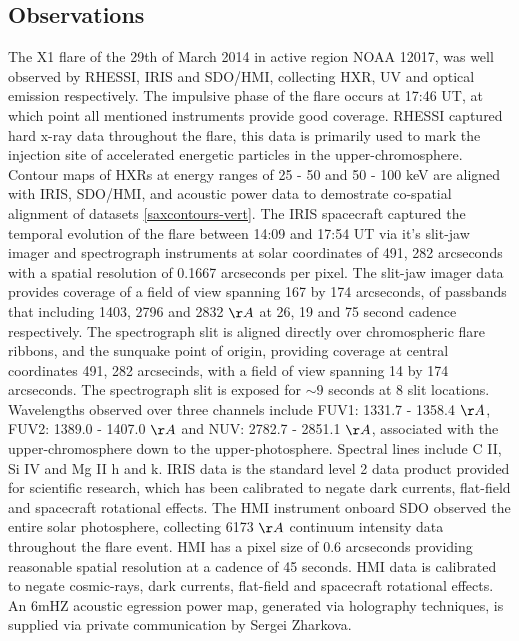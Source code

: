 \subsection{Observations}
The X1 flare of the 29th of March 2014 in active region NOAA 12017, was well observed by RHESSI, IRIS and SDO/HMI, collecting HXR, UV and optical emission respectively. The impulsive phase of the flare occurs at 17:46 UT, at which point all mentioned instruments provide good coverage. RHESSI captured hard x-ray data throughout the flare, this data is primarily used to mark the injection site of accelerated energetic particles in the upper-chromosphere. Contour maps of HXRs at energy ranges of 25 - 50 and 50 - 100 keV are aligned with IRIS, SDO/HMI, and acoustic power data to demostrate co-spatial alignment of datasets \ref{saxcontours-vert}. The IRIS spacecraft captured the temporal evolution of the flare between 14:09 and 17:54 UT via it's slit-jaw imager and spectrograph instruments at solar coordinates of 491, 282 arcseconds with a spatial resolution of 0.1667 arcseconds per pixel. The slit-jaw imager data provides coverage of a field of view spanning 167 by 174 arcseconds, of passbands that including 1403, 2796 and 2832 $\AA$ at 26, 19 and 75 second cadence respectively. The spectrograph slit is aligned directly over chromospheric flare ribbons, and the sunquake point of origin, providing coverage at central coordinates 491, 282 arcsecinds, with a field of view spanning 14 by 174 arcseconds. The spectrograph slit is exposed for $\sim9$ seconds at 8 slit locations. Wavelengths observed over three channels include FUV1: 1331.7 - 1358.4 $\AA$, FUV2: 1389.0 - 1407.0 $\AA$ and NUV: 2782.7 - 2851.1 $\AA$, associated with the upper-chromosphere down to the upper-photosphere. Spectral lines include C II, Si IV and Mg II h and k. IRIS data is the standard level 2 data product provided for scientific research, which has been calibrated to negate dark currents, flat-field and spacecraft rotational effects. The HMI instrument onboard SDO observed the entire solar photosphere, collecting 6173 $\AA$ continuum intensity data throughout the flare event. HMI has a pixel size of 0.6 arcseconds providing reasonable spatial resolution at a cadence of 45 seconds. HMI data is calibrated to negate cosmic-rays, dark currents, flat-field and spacecraft rotational effects. An 6mHZ acoustic egression power map, generated via holography techniques, is supplied via private communication by Sergei Zharkova.

